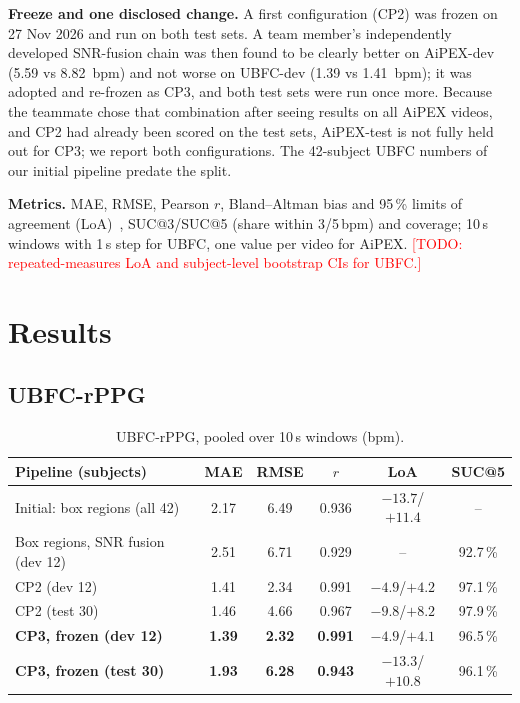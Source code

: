 \documentclass[conference]{IEEEtran}
\newcommand{\todo}[1]{\textcolor{red}{[TODO: #1]}}
\begin{document}
\textbf{Freeze and one disclosed change.} A first configuration (CP2) was frozen on 27 Nov 2026 and run on both test sets.
A team member's independently developed SNR-fusion chain was then found to be clearly better on AiPEX-dev (5.59 vs
\SI{8.82}{bpm}) and not worse on UBFC-dev (1.39 vs \SI{1.41}{bpm}); it was adopted and re-frozen as CP3, and both test
sets were run once more. Because the teammate chose that combination after seeing results on all AiPEX videos, and CP2
had already been scored on the test sets, AiPEX-test is not fully held out for CP3; we report both configurations.
The 42-subject UBFC numbers of our initial pipeline predate the split.

\textbf{Metrics.} MAE, RMSE, Pearson $r$, Bland--Altman bias and 95\,\% limits of agreement
(LoA)~\cite{bland1986statistical}, SUC@3/SUC@5 (share within 3/5\,bpm) and coverage; 10\,s windows with 1\,s step for UBFC,
one value per video for AiPEX. \todo{repeated-measures LoA and subject-level bootstrap CIs for UBFC.}

\section{Results}
\label{sec:results}

\subsection{UBFC-rPPG}
\begin{table}[t]
\centering
\caption{UBFC-rPPG, pooled over 10\,s windows (bpm).}
\label{tab:ubfc}
\begin{tabular}{@{}lccccc@{}}
\toprule
Pipeline (subjects) & MAE & RMSE & $r$ & LoA & SUC@5 \\
\midrule
Initial: box regions (all 42)       & 2.17 & 6.49 & 0.936 & $-13.7$/$+11.4$ & -- \\
Box regions, SNR fusion (dev 12)    & 2.51 & 6.71 & 0.929 & -- & 92.7\,\% \\
CP2 (dev 12)                        & 1.41 & 2.34 & 0.991 & $-4.9$/$+4.2$ & 97.1\,\% \\
CP2 (test 30)                       & 1.46 & 4.66 & 0.967 & $-9.8$/$+8.2$ & 97.9\,\% \\
\textbf{CP3, frozen (dev 12)}       & \textbf{1.39} & \textbf{2.32} & \textbf{0.991} & $-4.9$/$+4.1$ & 96.5\,\% \\
\textbf{CP3, frozen (test 30)}      & \textbf{1.93} & \textbf{6.28} & \textbf{0.943} & $-13.3$/$+10.8$ & 96.1\,\% \\
\bottomrule
\end{tabular}
\end{table}
\end{document}
